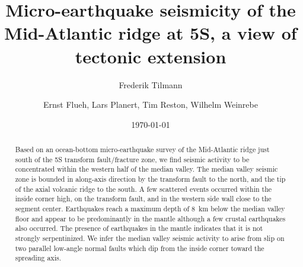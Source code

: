 \documentclass[jgr]{agu2001}
\newlength{\tw}
\begin{document}
\title{Micro-earthquake seismicity of the Mid-Atlantic ridge at
 5\dg S, a view of tectonic extension}
\author{Frederik Tilmann}
\author{Ernst Flueh, Lars Planert, Tim Reston, Wilhelm Weinrebe}
\date{\today}

\begin{abstract}
Based on an  ocean-bottom micro-earthquake survey of the
Mid-Atlantic ridge just south of the 5\dg S transform fault/fracture
zone, we find seismic activity to be concentrated within the western
half of the median valley.  The median valley seismic zone is bounded
in along-axis direction by the transform fault to the
north, and the tip of the axial volcanic ridge to the south.  A few
scattered events occurred within the inside corner high, on the
transform fault, and in the western side wall close to the segment
center. Earthquakes reach a maximum depth of 8~km below the median
valley floor and appear to be predominantly in the mantle although a
few crustal earthquakes also occurred.  The presence of
earthquakes in the mantle indicates that it is not strongly
serpentinized. We infer the median valley
seismic activity to arise from slip on two parallel low-angle normal
faults which dip from the inside corner toward the spreading
axis.
\end{abstract}
\end{document}
